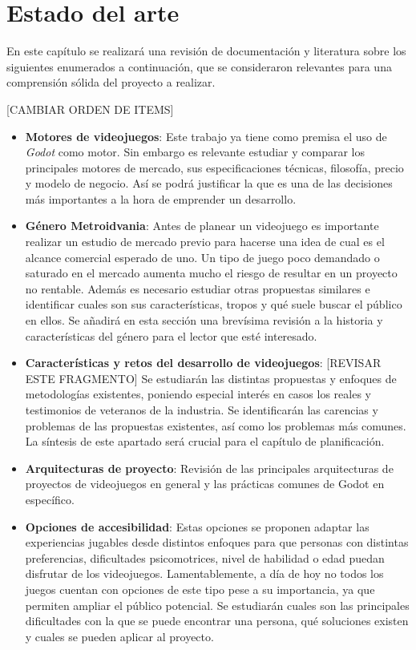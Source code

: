 \chapter{Estado del arte}

En este capítulo se realizará una revisión de documentación y literatura sobre los siguientes enumerados a continuación, que se consideraron relevantes para una comprensión sólida del proyecto a realizar.

[CAMBIAR ORDEN DE ITEMS]
\begin{itemize}
    \item \textbf{Motores de videojuegos}: Este trabajo ya tiene como premisa el uso de \textit{Godot} como motor. Sin embargo es relevante estudiar y comparar los principales motores de mercado, sus especificaciones técnicas, filosofía, precio y modelo de negocio. Así se podrá justificar la que es una de las decisiones más importantes a la hora de emprender un desarrollo.
    
    \item \textbf{Género Metroidvania}: Antes de planear un videojuego es importante realizar un estudio de mercado previo para hacerse una idea de cual es el alcance comercial esperado de uno. Un tipo de juego poco demandado o saturado en el mercado aumenta mucho el riesgo de resultar en un proyecto no rentable. Además es necesario estudiar otras propuestas similares e identificar cuales son sus características, tropos y qué suele buscar el público en ellos. Se añadirá en esta sección una brevísima revisión a la historia y características del género para el lector que esté interesado.
    
    \item \textbf{Características y retos del desarrollo de videojuegos}: [REVISAR ESTE FRAGMENTO] Se estudiarán las distintas propuestas y enfoques de metodologías existentes, poniendo especial interés en casos los reales y testimonios de veteranos de la industria. Se identificarán las carencias y problemas de las propuestas existentes, así como los problemas más comunes. La síntesis de este apartado será crucial para el capítulo de planificación.
    
    \item \textbf{Arquitecturas de proyecto}: Revisión de las principales arquitecturas de proyectos de videojuegos en general y las prácticas comunes de Godot en específico.
    
    \item \textbf{Opciones de accesibilidad}: Estas opciones se proponen adaptar las experiencias jugables desde distintos enfoques para que personas con distintas preferencias, dificultades psicomotrices, nivel de habilidad o edad puedan disfrutar de los videojuegos. Lamentablemente, a día de hoy no todos los juegos cuentan con opciones de este tipo pese a su importancia, ya que permiten ampliar el público potencial. Se estudiarán cuales son las principales dificultades con la que se puede encontrar una persona, qué soluciones existen y cuales se pueden aplicar al proyecto.
    

\end{itemize}
